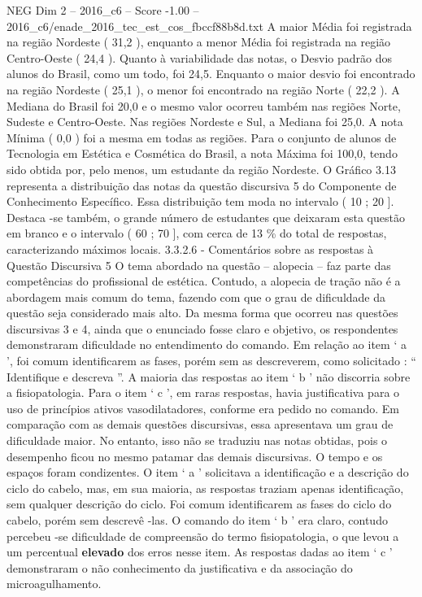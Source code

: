 \begin{textsample}{NEG Dim 2 – 2016\_c6 – Score -1.00 – 2016\_c6/enade\_2016\_tec\_est\_cos\_fbccf88b8d.txt}
A maior Média foi registrada na região Nordeste ( 31,2 ), enquanto a menor Média foi registrada na região Centro-Oeste ( 24,4 ).
Quanto à variabilidade das notas, o Desvio padrão dos alunos do Brasil, como um todo, foi 24,5.
Enquanto o maior desvio foi encontrado na região Nordeste ( 25,1 ), o menor foi encontrado na região Norte ( 22,2 ).
A Mediana do Brasil foi 20,0 e o mesmo valor ocorreu também nas regiões Norte, Sudeste e Centro-Oeste.
Nas regiões Nordeste e Sul, a Mediana foi 25,0.
A nota Mínima ( 0,0 ) foi a mesma em todas as regiões.
Para o conjunto de alunos de Tecnologia em Estética e Cosmética do Brasil, a nota Máxima foi 100,0, tendo sido obtida por, pelo menos, um estudante da região Nordeste.
O Gráfico 3.13 representa a distribuição das notas da questão discursiva 5 do Componente de Conhecimento Específico.
Essa distribuição tem moda no intervalo ( 10 ; 20 ].
Destaca -se também, o grande número de estudantes que deixaram esta questão em branco e o intervalo ( 60 ; 70 ], com cerca de 13 \% do total de respostas, caracterizando máximos locais. 3.3.2.6 - Comentários sobre as respostas à Questão Discursiva 5 O tema abordado na questão – alopecia – faz parte das competências do profissional de estética.
Contudo, a alopecia de tração não é a abordagem mais comum do tema, fazendo com que o grau de dificuldade da questão seja considerado mais alto.
Da mesma forma que ocorreu nas questões discursivas 3 e 4, ainda que o enunciado fosse claro e objetivo, os respondentes demonstraram dificuldade no entendimento do comando.
Em relação ao item ‘ a ’, foi comum identificarem as fases, porém sem as descreverem, como solicitado : “ Identifique e descreva ”.
A maioria das respostas ao item ‘ b ’ não discorria sobre a fisiopatologia.
Para o item ‘ c ’, em raras respostas, havia justificativa para o uso de princípios ativos vasodilatadores, conforme era pedido no comando.
Em comparação com as demais questões discursivas, essa apresentava um grau de dificuldade maior.
No entanto, isso não se traduziu nas notas obtidas, pois o desempenho ficou no mesmo patamar das demais discursivas.
O tempo e os espaços foram condizentes.
O item ‘ a ’ solicitava a identificação e a descrição do ciclo do cabelo, mas, em sua maioria, as respostas traziam apenas identificação, sem qualquer descrição do ciclo.
Foi comum identificarem as fases do ciclo do cabelo, porém sem descrevê -las.
O comando do item ‘ b ’ era claro, contudo percebeu -se dificuldade de compreensão do termo fisiopatologia, o que levou a um percentual \textbf{elevado} dos erros nesse item.
As respostas dadas ao item ‘ c ’ demonstraram o não conhecimento da justificativa e da associação do microagulhamento.

\end{textsample}
